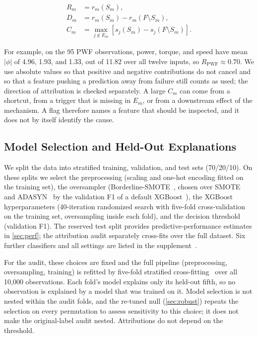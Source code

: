 \documentclass[conference]{IEEEtran}
\begin{document}
\begin{align}
R_m &= r_m(S_m),
\label{eq:share}\\
D_m &= r_m(S_m)-r_m(F\setminus S_m),
\label{eq:spec}\\
C_m &= \max_{j\notin E_m}
\left[
s_j(S_m)-s_j(F\setminus S_m)
\right].
\label{eq:shortcut}
\end{align}

For example, on the 95 PWF observations, power, torque, and speed have mean $|\phi|$ of 4.96, 1.93, and 1.33, out of 11.82 over all twelve inputs, so $R_{\mathrm{PWF}}\approx0.70$. We use absolute values so that positive and negative contributions do not cancel and so that a feature pushing a prediction away from failure still counts as used; the direction of attribution is checked separately. A large $C_m$ can come from a shortcut, from a trigger that is missing in $E_m$, or from a downstream effect of the mechanism. A flag therefore names a feature that should be inspected, and it does not by itself identify the cause.

\subsection{Model Selection and Held-Out Explanations}
\label{sec:training}

We split the data into stratified training, validation, and test sets (70/20/10). On these splits we select the preprocessing (scaling and one-hot encoding fitted on the training set), the oversampler (Borderline-SMOTE~\cite{han2005borderline}, chosen over SMOTE~\cite{chawla2002smote} and ADASYN~\cite{he2008adasyn} by the validation F1 of a default XGBoost~\cite{chen2016xgboost}), the XGBoost hyperparameters (40-iteration randomized search with five-fold cross-validation on the training set, oversampling inside each fold), and the decision threshold (validation F1). The reserved test split provides predictive-performance estimates in \cref{sec:perf}; the attribution audit separately cross-fits over the full dataset. Six further classifiers and all settings are listed in the supplement~\cite{artifact}.

For the audit, these choices are fixed and the full pipeline (preprocessing, oversampling, training) is refitted by five-fold stratified cross-fitting~\cite{chernozhukov2018double} over all 10{,}000 observations. Each fold's model explains only its held-out fifth, so no observation is explained by a model that was trained on it. Model selection is not nested within the audit folds, and the re-tuned null (\cref{sec:robust}) repeats the selection on every permutation to assess sensitivity to this choice; it does not make the original-label audit nested. Attributions do not depend on the threshold.
\end{document}
